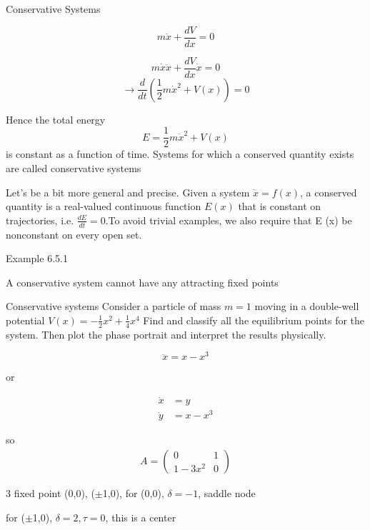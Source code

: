 \documentclass[9pt,aspectratio=43,mathserif,table]{beamer}
\begin{document}
\begin{frame}[label=current]{Conservative Systems}
  \begin{multicols}{2}
    $$m \ddot x + \frac{ dV}{dx} = 0$$

    $$m \dot x \ddot x + \frac{ dV}{dx} \dot x = 0 $$$$\rightarrow \frac{ d}{dt} (\frac{ 1}{2} m \dot x ^ 2 + V(x) ) = 0$$

    Hence the total energy 
    $$E = \frac{ 1}{2} m \dot x ^ 2 + V(x) $$
    is constant as a function of time.  Systems for which a conserved quantity 
    exists are called conservative systems

    \medskip

Let's be a bit more general and precise. Given a system $\dot x = f(x)$, a conserved 
quantity is a real-valued continuous function $ E(x)$ that is constant on trajectories, 
i.e. $\frac{ d E}{d t} = 0$.To avoid trivial examples, we also require that E (x) be nonconstant 
on every open set.

  \medskip
    Example 6.5.1

    A conservative system cannot have any attracting fixed points

  \end{multicols}
\end{frame}

\begin{frame}[label=current]{Conservative systems}
Consider a particle of mass $m = 1$ moving in a double-well potential 
$V(x) = -\frac{1 }{2} x^2 + \frac{ 1}{4} x^4$
Find and classify all the equilibrium points for the system. 
Then plot the phase portrait and interpret the results physically.

\bigskip

$$\ddot x = x - x^3$$


or 


    \begin{equation}
      \begin{aligned}
        \dot x &= y \\
        \dot y &= x - x^3
      \end{aligned}
    \end{equation}

so 
    \begin{equation}
      \begin{aligned}
        A = 
        \begin{pmatrix}
           0 & 1\\
           1-3x^2 & 0
        \end{pmatrix}
      \end{aligned}
    \end{equation}

3 fixed point (0,0), ($\pm$1,0), for (0,0), $\delta = -1$, saddle node

for ($\pm$1,0), $\delta = 2, \tau = 0$, this is a center
\end{frame}
\end{document}
